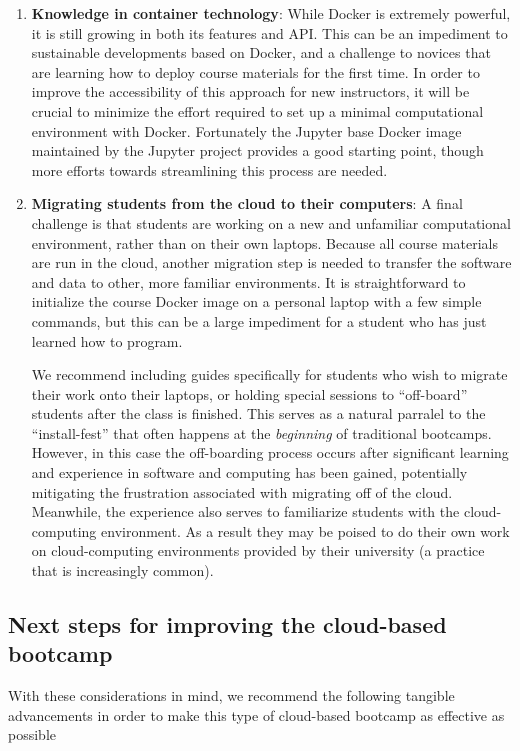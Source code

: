 \begin{enumerate}
\item {\bf Knowledge in container technology}: While Docker is extremely powerful,
it is still growing in both its features and API. This can be an impediment to
sustainable developments based on Docker, and a challenge to novices that are
learning how to deploy course materials for the first time. In order to improve
the accessibility of this approach for new instructors, it will be crucial to
minimize the effort required to set up a minimal computational environment with
Docker. Fortunately the Jupyter base Docker image maintained by the Jupyter
project provides a good starting point, though more efforts towards streamlining
this process are needed.

\item {\bf Migrating students from the cloud to their computers}: A final
challenge is that students are working on a new and
unfamiliar computational environment, rather than on their own laptops. Because
all course materials are run in the cloud, another migration step is
needed to transfer the software and data to other, more familiar environments.
It is straightforward to initialize the course Docker image on a
personal laptop with a
few simple commands, but this can be a large impediment for a student who has
just learned how to program.

We recommend including guides specifically for
students who wish to migrate their work onto their laptops, or holding special
sessions to ``off-board'' students after the class is finished. This serves as a
natural parralel to the ``install-fest'' that often happens at the
\emph{beginning} of traditional bootcamps. However, in this case the
off-boarding process occurs after significant learning and experience in
software and computing has been gained, potentially mitigating the frustration
associated with migrating off of the cloud. Meanwhile, the experience also
serves to familiarize students with the cloud-computing environment. As a result
they may be poised to do their own work on cloud-computing environments
provided by their university (a practice that is increasingly common).

\end{enumerate}

\subsection{Next steps for improving the cloud-based bootcamp}

With these considerations in mind, we recommend the following tangible
advancements in order to make this type of cloud-based bootcamp as effective
as possible

